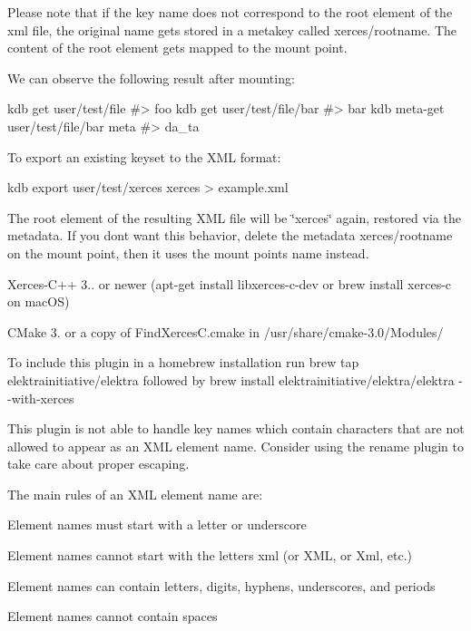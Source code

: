 Please note that if the key name does not correspond to the root element of the xml file, the original name gets stored in a metakey called {\ttfamily xerces/rootname}. The content of the root element gets mapped to the mount point.

We can observe the following result after mounting\+:


\begin{DoxyCode}
kdb get user/test/file
#> foo
kdb get user/test/file/bar
#> bar
kdb meta-get user/test/file/bar meta
#> da\_ta
\end{DoxyCode}


To export an existing keyset to the X\+ML format\+:


\begin{DoxyCode}
kdb export user/test/xerces xerces > example.xml
\end{DoxyCode}


The root element of the resulting X\+ML file will be \char`\"{}xerces\char`\"{} again, restored via the metadata. If you don\textquotesingle{}t want this behavior, delete the metadata {\ttfamily xerces/rootname} on the mount point, then it uses the mount point\textquotesingle{}s name instead.


\begin{DoxyItemize}
\item {\ttfamily Xerces-\/\+C++ 3..} or newer ({\ttfamily apt-\/get install libxerces-\/c-\/dev} or {\ttfamily brew install xerces-\/c} on mac\+OS)
\item C\+Make 3. or a copy of {\ttfamily Find\+Xerces\+C.\+cmake} in {\ttfamily /usr/share/cmake-\/3.0/\+Modules/}
\end{DoxyItemize}

To include this plugin in a homebrew installation run {\ttfamily brew tap elektrainitiative/elektra} followed by {\ttfamily brew install elektrainitiative/elektra/elektra -\/-\/with-\/xerces}

This plugin is not able to handle key names which contain characters that are not allowed to appear as an X\+ML element name. Consider using the rename plugin to take care about proper escaping.

The main rules of an X\+ML element name are\+:


\begin{DoxyItemize}
\item Element names must start with a letter or underscore
\item Element names cannot start with the letters xml (or X\+ML, or Xml, etc.)
\item Element names can contain letters, digits, hyphens, underscores, and periods
\item Element names cannot contain spaces
\end{DoxyItemize}

